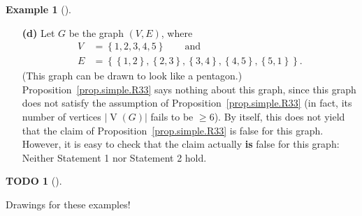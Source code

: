 \documentclass[numbers=enddot,12pt,final,onecolumn,notitlepage]{scrartcl}%
\theoremstyle{definition}
\newtheorem{exam}[theo]{Example}
\newenvironment{example}[1][]
{\begin{exam}[#1]\begin{leftbar}}
{\end{leftbar}\end{exam}}
\newtheorem{quest}[theo]{TODO}
\newenvironment{todo}[1][]
{\begin{quest}[#1]\begin{leftbar}}
{\end{leftbar}\end{quest}}
\newcommand{\set}[1]{\left\{ #1 \right\}}
\newcommand{\abs}[1]{\left| #1 \right|}
\newcommand{\tup}[1]{\left( #1 \right)}
\newcommand{\verts}[1]{\operatorname{V}\left( #1 \right)}
\begin{document}
\begin{example}
\begin{enumerate}
\item[\textbf{(d)}] Let $G$ be the graph $\tup{V, E}$, where
\begin{align*}
V &= \set{1, 2, 3, 4, 5} \qquad \text{and} \\
E &= \set{\set{1,2}, \set{2,3}, \set{3,4}, \set{4,5}, \set{5,1}} .
\end{align*}
(This graph can be drawn to look like a pentagon.)
Proposition~\ref{prop.simple.R33} says nothing about this graph,
since this graph does not satisfy the assumption of
Proposition~\ref{prop.simple.R33} (in fact, its number of vertices
$\abs{\verts{G}}$ fails to be $\geq 6$).
By itself, this does not yield that the claim of
Proposition~\ref{prop.simple.R33} is false for this graph. However,
it is easy to check that the claim actually \textbf{is} false for this
graph: Neither Statement 1 nor Statement 2 hold.
\end{enumerate}

\end{example}

\begin{todo}
Drawings for these examples!
\end{todo}
\end{document}
